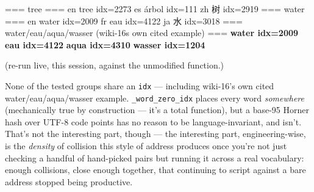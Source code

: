 \documentclass[
  10pt,
]{article}
\newenvironment{Shaded}{}{}
\newcommand{\DecValTok}[1]{\textcolor[rgb]{0.25,0.63,0.44}{#1}}
\newcommand{\ErrorTok}[1]{\textcolor[rgb]{1.00,0.00,0.00}{\textbf{#1}}}
\newcommand{\NormalTok}[1]{#1}
\newcommand{\OperatorTok}[1]{\textcolor[rgb]{0.40,0.40,0.40}{#1}}
\newcommand{\StringTok}[1]{\textcolor[rgb]{0.25,0.44,0.63}{#1}}
\begin{document}
\begin{Shaded}
\begin{Highlighting}[]
\OperatorTok{===}\NormalTok{ tree }\OperatorTok{===}
\NormalTok{  en  }\StringTok{\textquotesingle{}tree\textquotesingle{}}\NormalTok{      idx}\OperatorTok{=}\DecValTok{2273}
\NormalTok{  es  }\StringTok{\textquotesingle{}árbol\textquotesingle{}}\NormalTok{     idx}\OperatorTok{=}\DecValTok{111}
\NormalTok{  zh  }\StringTok{\textquotesingle{}树\textquotesingle{}}\NormalTok{        idx}\OperatorTok{=}\DecValTok{2919}
\OperatorTok{===}\NormalTok{ water }\OperatorTok{===}
\NormalTok{  en  }\StringTok{\textquotesingle{}water\textquotesingle{}}\NormalTok{     idx}\OperatorTok{=}\DecValTok{2009}
\NormalTok{  fr  }\StringTok{\textquotesingle{}eau\textquotesingle{}}\NormalTok{       idx}\OperatorTok{=}\DecValTok{4122}
\NormalTok{  ja  }\StringTok{\textquotesingle{}水\textquotesingle{}}\NormalTok{        idx}\OperatorTok{=}\DecValTok{3018}
\OperatorTok{===}\NormalTok{ water}\OperatorTok{/}\NormalTok{eau}\OperatorTok{/}\NormalTok{aqua}\OperatorTok{/}\NormalTok{wasser (wiki}\OperatorTok{{-}}\DecValTok{16}\StringTok{\textquotesingle{}s own cited example) ===}
\ErrorTok{  \textquotesingle{}water\textquotesingle{}     idx=2009}
\ErrorTok{  \textquotesingle{}eau\textquotesingle{}       idx=4122}
\ErrorTok{  \textquotesingle{}aqua\textquotesingle{}      idx=4310}
\ErrorTok{  \textquotesingle{}wasser\textquotesingle{}    idx=1204}
\end{Highlighting}
\end{Shaded}

(re-run live, this session, against the unmodified function.)

None of the tested groups share an \texttt{idx} --- including wiki-16's
own cited water/eau/aqua/wasser example. \texttt{\_word\_zero\_idx}
places every word \emph{somewhere} (mechanically true by construction
--- it's a total function), but a base-95 Horner hash over UTF-8 code
points has no reason to be language-invariant, and isn't. That's not the
interesting part, though --- the interesting part, engineering-wise, is
the \emph{density} of collision this style of address produces once
you're not just checking a handful of hand-picked pairs but running it
across a real vocabulary: enough collisions, close enough together, that
continuing to script against a bare address stopped being productive.
\end{document}
